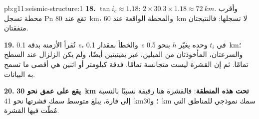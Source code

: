\begin{solution}{pb:g11:seismic-structure:1}
\textbf{18.} $\tan i_c \approx 1.18$: $2 \times 30.3 \times 1.18 \approx
\qty{72}{km}$. وأقرب محطة تسجل Pn تقع عند \qty{80}{km}، والمحطة
الواقعة عند \qty{60}{km} لا تسجلها: فالنتيجتان متفقتان.

\textbf{19.} تُقرأ الأزمنة بدقة \qty{0.1}{s}، والخطأ بمقدار
\qty{0.1}{s} في $t_i$ وحده يغيّر $h$ بنحو \qty{0.5}{km}؛ والسرعتان،
المأخوذتان من الميلين، غير يقينيتين أيضًا، ولم يكن الزلزال عند
السطح تمامًا. ثم إن القشرة ليست متجانسة تمامًا. فدقة كيلومتر
أو اثنين هي أقصى ما تسمح به البيانات.

\textbf{20.} \textbf{يقع  على عمق نحو \qty{30}{km} تحت هذه المنطقة}:
فالقشرة هنا رقيقة نسبيًا بالنسبة إلى قارة، يبلغ متوسط سمك قشرتها نحو
\qty{41}{km}؛ و\qty{30}{km} سمك نموذجي للمناطق التي
مُطّت فيها القشرة.
\end{solution}

